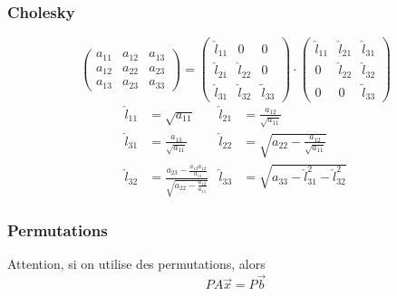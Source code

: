 \documentclass[resume]{subfiles}
\begin{document}
\subsubsection{Cholesky}
$$\begin{pmatrix}
a_{11} & a_{12} & a_{13}\\
a_{12} & a_{22} & a_{23}\\
a_{13} & a_{23} & a_{33}
\end{pmatrix}=\begin{pmatrix}
\hat{l}_{11} & 0 & 0\\
\hat{l}_{21} & \hat{l}_{22} & 0\\
\hat{l}_{31} & \hat{l}_{32} & \tilde{l}_{33}
\end{pmatrix}\cdot\begin{pmatrix}
\hat{l}_{11} & \hat{l}_{21} & \hat{l}_{31}\\
0 & \hat{l}_{22} & \hat{l}_{32}\\
0 & 0 & \tilde{l}_{33}
\end{pmatrix}$$
\begin{align*}
\hat{l}_{11}&=\sqrt{a_{11}} & \hat{l}_{21}&=\frac{a_{12}}{\sqrt{a_{11}}}\\
\hat{l}_{31}&=\frac{a_{13}}{\sqrt{a_{11}}} & \hat{l}_{22}&=\sqrt{a_{22}-\frac{a_{12}}{\sqrt{a_{11}}}}\\
\hat{l}_{32}&=\frac{a_{23}-\frac{a_{13}a_{12}}{a_{11}}}{\sqrt{a_{22}-\frac{a_{12}}{a_{11}}}} & \hat{l}_{33}&=\sqrt{a_{33}-\hat{l}_{31}^2-\hat{l}_{32}^2}
\end{align*}
\subsubsection{Permutations}
Attention, si on utilise des permutations, alors
$$PA\vec{x}=P\vec{b}$$
\end{document}
